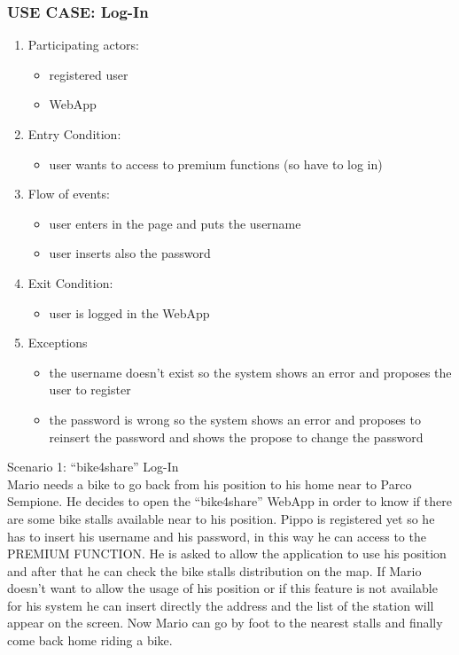 \documentclass{article}
\begin{document}
\subsubsection{\textbf{USE CASE}: Log-In}
\begin{enumerate}
\item Participating actors: 
\begin{itemize}
    \item registered user
    \item WebApp
\end{itemize}
\item Entry Condition: 
\begin{itemize}
    \item user wants to access to premium functions (so have to log in)
\end{itemize}
\item Flow of events: 
\begin{itemize}
    \item user enters in the page and puts the username
    \item user inserts also the password
\end{itemize}
\item Exit Condition: 
\begin{itemize}
    \item user is logged in the WebApp
\end{itemize}
\item Exceptions
\begin{itemize}
    \item the username doesn’t exist so the system shows an error and proposes the user to register
    \item the password is wrong so the system shows an error and proposes to reinsert the password and shows the propose to change the password 
\end{itemize}
\end{enumerate}

Scenario 1: “bike4share” Log-In \\
Mario needs a bike to go back from his position to his home near to Parco Sempione. He decides to open the “bike4share” WebApp in order to know if there are some bike stalls available near to his position. 
Pippo is registered yet so he has to insert his username and his password, in this way he can access to the PREMIUM FUNCTION. 
He is asked to allow the application to use his position and after that he can check the bike stalls distribution on the map. 
If Mario doesn’t want to allow the usage of his position or if this feature is not available for his system he can insert directly the address and the list of the station will appear on the screen. Now Mario can go by foot to the nearest stalls and finally come back home riding a bike.
\end{document}
